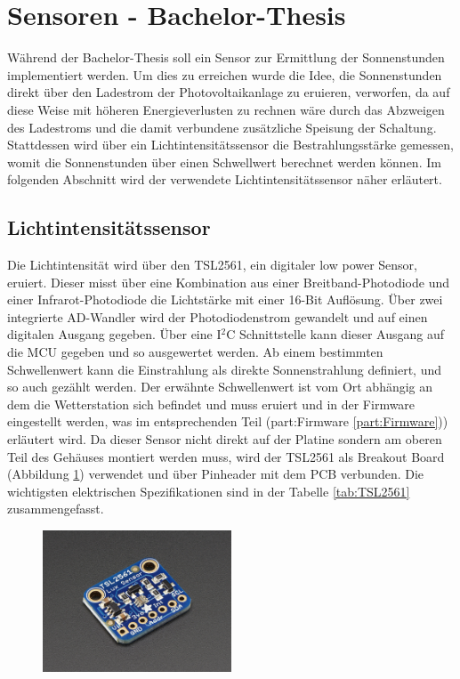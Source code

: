 \section{Sensoren - Bachelor-Thesis}
Während der Bachelor-Thesis soll ein Sensor zur Ermittlung der Sonnenstunden implementiert werden. Um dies zu erreichen wurde die Idee, die Sonnenstunden direkt über den Ladestrom der Photovoltaikanlage zu eruieren, verworfen, da auf diese Weise mit höheren Energieverlusten zu rechnen wäre durch das Abzweigen des Ladestroms und die damit verbundene zusätzliche Speisung der Schaltung. Stattdessen wird über ein Lichtintensitätssensor die Bestrahlungsstärke gemessen, womit die Sonnenstunden über einen Schwellwert berechnet werden können. Im folgenden Abschnitt wird der verwendete Lichtintensitätssensor näher erläutert.

\subsection{Lichtintensitätssensor}
Die Lichtintensität wird über den TSL2561, ein digitaler low power Sensor, eruiert. Dieser misst über eine Kombination aus einer Breitband-Photodiode und einer Infrarot-Photodiode die Lichtstärke mit einer 16-Bit Auflösung. Über zwei integrierte AD-Wandler wird der Photodiodenstrom gewandelt und auf einen digitalen Ausgang gegeben. Über eine I$^{2}$C Schnittstelle kann dieser Ausgang auf die MCU gegeben und so ausgewertet werden. Ab einem bestimmten Schwellenwert kann die Einstrahlung als direkte Sonnenstrahlung definiert, und so auch gezählt werden. Der erwähnte Schwellenwert ist vom Ort abhängig an dem die Wetterstation sich befindet und muss eruiert und in der Firmware eingestellt werden, was im entsprechenden Teil (\refname{part:Firmware} \ref{part:Firmware})) erläutert wird. Da dieser Sensor nicht direkt auf der Platine sondern am oberen Teil des Gehäuses montiert werden muss, wird der TSL2561 als Breakout Board (Abbildung \ref{fig:TSL}) verwendet und über Pinheader mit dem PCB verbunden. Die wichtigsten elektrischen Spezifikationen sind in der Tabelle \ref{tab:TSL2561} zusammengefasst. \cite{TSL2561}\\

\begin{figure}[hbtp]
\centering
\includegraphics[width=0.5\textwidth]{graphics/TSL2561/TSL2561_Breakout.JPG}
\label{fig:TSL}
\end{figure}

